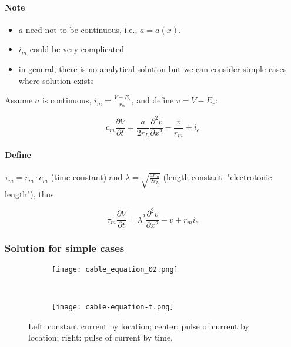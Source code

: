 \documentclass[main]{subfiles}
\begin{document}
\begin{figure}[H]
	\centering
\end{figure}

\paragraph{Note}
\begin{itemize}
\item $a$ need not to be continuous, i.e., $a = a(x)$.
\item $i_m$ could be very complicated
\item in general, there is no analytical solution
\subitem but we can consider simple cases where solution exists
\end{itemize}

Assume $a$ is continuous, $i_m = \frac{V - E_r}{r_m}$, and define $v = V - E_r$:

\[c_m\frac{\partial V}{\partial t} = \frac{a}{2r_L}\frac{\partial^2 v}{\partial x^2}- \frac{v}{r_m} + i_e\]


\paragraph{Define}
$\tau_m = r_m \cdot c_m$ (time constant) and $\lambda = \sqrt{\frac{a r_m}{2 r_L}}$ (length constant: "electrotonic length"), thus:

\[\tau_m\frac{\partial V}{\partial t} = \lambda^2 \frac{\partial^2 v}{\partial x^2} - v + r_m i_e\]

\subsubsection{Solution for simple cases}

\begin{figure}[H]
	\centering
	\begin{subfigure}[b]{0.6\textwidth}
		\centering
		\texttt{[image: cable\_equation\_02.png]}
	\end{subfigure}%
	~
	\begin{subfigure}[b]{0.3\textwidth}
		\centering
		\texttt{[image: cable-equation-t.png]}
	\end{subfigure}
	\caption{Left: constant current by location; center: pulse of current by location; right: pulse of current by time.}
	\label{fig:cable-equation}
\end{figure}
\end{document}
